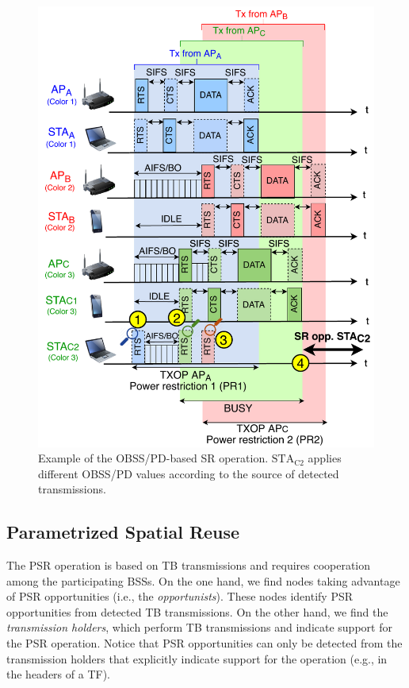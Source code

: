 \documentclass{ieeeaccess}
\begin{document}
\begin{figure}[ht!]
	\centering
	\includegraphics[width=\columnwidth]{fig_12}
	\caption{Example of the OBSS/PD-based SR operation. $\text{STA}_\text{C2}$ applies different OBSS/PD values according to the source of detected transmissions.}
	\label{fig:fig_12}
\end{figure}

\subsection{Parametrized Spatial Reuse}
\label{section:srp_based}	
The PSR operation is based on TB transmissions and requires cooperation among the participating BSSs. On the one hand, we find nodes taking advantage of PSR opportunities (i.e., the \emph{opportunists}). These nodes identify PSR opportunities from detected TB transmissions. On the other hand, we find the \emph{transmission holders}, which perform TB transmissions and indicate support for the PSR operation. Notice that PSR opportunities can only be detected from the transmission holders that explicitly indicate support for the operation (e.g., in the headers of a TF).
\end{document}

